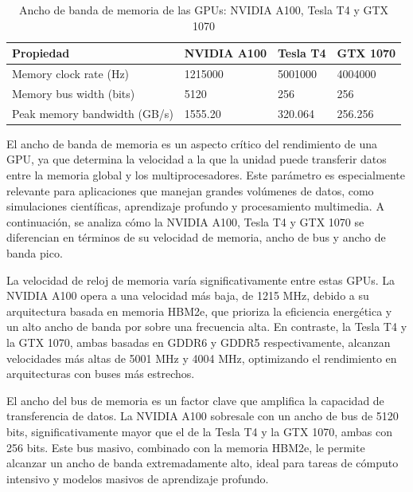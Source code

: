 \documentclass{article}
\begin{document}
			\begin{table}[H]
				\begin{adjustbox}{width=\textwidth, keepaspectratio}
					\begin{tabular}{|l|l|l|l|}
						\hline
						\textbf{Propiedad} & \textbf{NVIDIA A100} & \textbf{Tesla T4} & \textbf{GTX 1070} \\ \hline
						Memory clock rate (Hz) & 1215000 & 5001000 & 4004000 \\ \hline
						Memory bus width (bits) & 5120 & 256 & 256 \\ \hline
						Peak memory bandwidth (GB/s) & 1555.20 & 320.064 & 256.256 \\ \hline
					\end{tabular}
				\end{adjustbox}
				\centering
				\caption{Ancho de banda de memoria de las GPUs: NVIDIA A100, Tesla T4 y GTX 1070}
			\end{table}

			El ancho de banda de memoria es un aspecto crítico del rendimiento de una GPU, ya que determina la velocidad a la que la unidad puede transferir datos entre la memoria global y los multiprocesadores. Este parámetro es especialmente relevante para aplicaciones que manejan grandes volúmenes de datos, como simulaciones científicas, aprendizaje profundo y procesamiento multimedia. A continuación, se analiza cómo la NVIDIA A100, Tesla T4 y GTX 1070 se diferencian en términos de su velocidad de memoria, ancho de bus y ancho de banda pico.

			La velocidad de reloj de memoria varía significativamente entre estas GPUs. La NVIDIA A100 opera a una velocidad más baja, de 1215 MHz, debido a su arquitectura basada en memoria HBM2e, que prioriza la eficiencia energética y un alto ancho de banda por sobre una frecuencia alta. En contraste, la Tesla T4 y la GTX 1070, ambas basadas en GDDR6 y GDDR5 respectivamente, alcanzan velocidades más altas de 5001 MHz y 4004 MHz, optimizando el rendimiento en arquitecturas con buses más estrechos.

			El ancho del bus de memoria es un factor clave que amplifica la capacidad de transferencia de datos. La NVIDIA A100 sobresale con un ancho de bus de 5120 bits, significativamente mayor que el de la Tesla T4 y la GTX 1070, ambas con 256 bits. Este bus masivo, combinado con la memoria HBM2e, le permite alcanzar un ancho de banda extremadamente alto, ideal para tareas de cómputo intensivo y modelos masivos de aprendizaje profundo.
\end{document}
